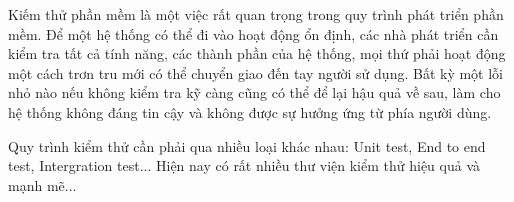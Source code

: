 Kiếm thử phần mềm là một việc rất quan trọng trong quy trình phát triển phần mềm. Để một hệ thống có thể đi vào hoạt động ổn định, các nhà phát triển cần kiểm tra tất cả tính năng, các thành phần của hệ thống, mọi thứ phải hoạt động một cách trơn tru mới có thể chuyển giao đến tay người sử dụng. Bất kỳ một lỗi nhỏ nào nếu không kiểm tra kỹ càng cũng có thể để lại hậu quả về sau, làm cho hệ thống không đáng tin cậy và không được sự hưởng ứng từ phía người dùng.\par

Quy trình kiểm thử cần phải qua nhiều loại khác nhau: Unit test, End to end test, Intergration test... Hiện nay có rất nhiều thư viện kiểm thử hiệu quả và mạnh mẽ...
